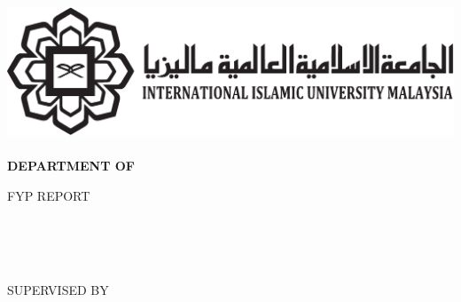 \documentclass[a4paper]{memoir}
\begin{document}
\thispagestyle{empty}
\begin{LARGE}
\begin{center}
\includegraphics[scale=0.7]{../images/iium}\\[24pt]

{\fontsize{18pt}{20pt}\selectfont
  \textbf{\MakeTextUppercase{\myKulliyyah}\\[24pt]}
  \textbf{\MakeTextUppercase{Department of \myDepartment}\\[12pt]}
}

{\fontsize{16pt}{18pt}\selectfont
  \MakeTextUppercase{FYP Report}\\[48pt]
  \MakeTextUppercase{\myTitle}\\
}

\vfill

{\fontsize{14pt}{16pt}\selectfont
  \MakeTextUppercase{\myName}\\
  \MakeTextUppercase{\myMatric}\\

  \vfill

  \MakeTextUppercase{Supervised by}\\[10pt]
  \MakeTextUppercase{\mySupervisor}\\

  \vfill

  \MakeTextUppercase{\myTime}\\
  \MakeTextUppercase{\mySemester}\\
}
\end{center}
\end{LARGE}
\end{document}
